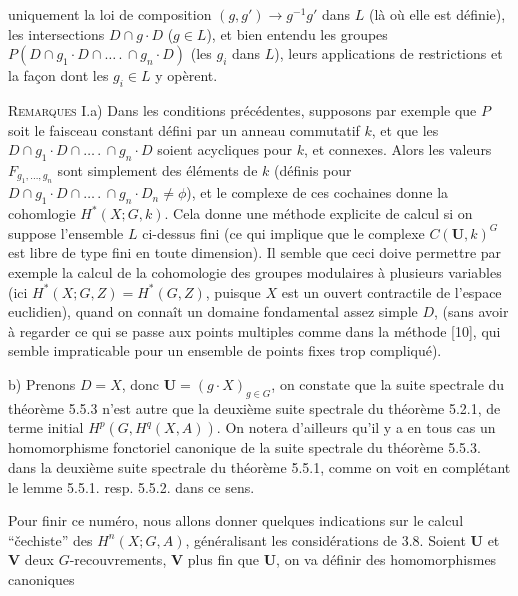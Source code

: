 \clearpage
{}

\noindent uniquement la loi de composition $(g,g')\to g^{-1}g'$ dans $L$
(là où elle est définie), les intersections $D\cap g\cdot D$ ($g\in L$), et
bien entendu les groupes
$P(D\cap g_1\cdot D\cap\ldots\,.\,\cap g_n\cdot D)$ (les $g_i$ dans $L$), leurs
applications de restrictions et la façon dont les $g_i\in L$ y opèrent.

\textsc{Remarques I.}\quad a) Dans les conditions précédentes,
supposons par exemple que $P$ soit le faisceau constant défini par un anneau
commutatif $k$, et que les
$D\cap g_1\cdot D\cap\ldots\,.\,\cap g_n\cdot D$ soient acycliques pour $k$, et
connexes. Alors les valeurs $F_{g_1,\ldots,g_n}$ sont simplement des éléments
de $k$ (définis pour
$D\cap g_1\cdot D\cap\ldots\,.\,\cap g_n\cdot D_n\ne\phi$), et le complexe de ces
cochaines donne la cohomlogie $H^*(X;G,k)$. Cela donne une méthode explicite de
calcul si on suppose l'ensemble $L$ ci-dessus fini (ce qui implique que le
complexe $C({\mathbf U},k)^G$ est libre de type fini en toute dimension). Il
semble que ceci doive permettre par exemple la calcul de la cohomologie des
groupes modulaires à plusieurs variables (ici
$H^*(X;G,Z)=H^*(G,Z)$, puisque $X$ est un ouvert contractile de
l'espace euclidien), quand on connaît un domaine fondamental assez simple $D$,
(sans avoir à regarder ce qui se passe aux points multiples comme dans la
méthode [10], qui semble impraticable pour un ensemble de points fixes trop
compliqué).

b) Prenons $D=X$, donc ${\mathbf U}=(g\cdot X)_{g\in G}$, on constate que la
suite spectrale du théorème 5.5.3 n'est autre que la deuxième suite spectrale du
théorème 5.2.1, de terme initial $H^p(G,H^q(X,A))$. On notera d'ailleurs qu'il
y a en tous cas un homomorphisme fonctoriel canonique de la suite spectrale du
théorème 5.5.3. dans la deuxième suite spectrale du théorème 5.5.1, comme on
voit en complétant le lemme 5.5.1. resp. 5.5.2. dans ce sens.

Pour finir ce numéro, nous allons donner quelques indications sur le calcul
``\v{c}echiste'' des $H^n(X;G,A)$, généralisant les considérations de 3.8. Soient
${\mathbf U}$ et ${\mathbf V}$ deux $G$-recouvrements, ${\mathbf V}$ plus fin que
${\mathbf U}$, on va définir des homomorphismes canoniques

